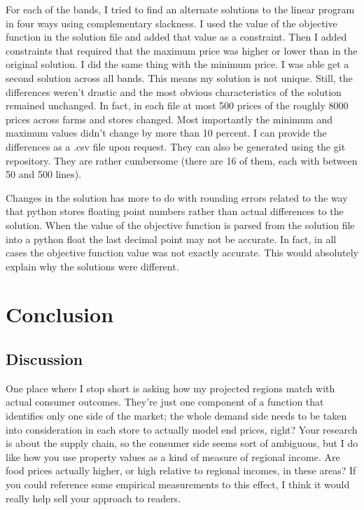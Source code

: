 \documentclass{report}
\begin{document}
For each of the bands, I tried to find an alternate solutions to the linear program in four ways using complementary slackness. I used the value of the objective function in the solution file and added that value as a constraint. Then I added constraints that required that the maximum price was higher or lower than in the original solution. I did the same thing with the minimum price. I was able get a second solution across all bands. This means my solution is not unique. Still, the differences weren't drastic and the most obvious characteristics of the solution remained unchanged. In fact, in each file at most 500 prices of the roughly 8000 prices across farms and stores changed. Most importantly the minimum and maximum values didn't change by more than 10 percent. I can provide the differences as a .csv file upon request. They can also be generated using the git repository. They are rather cumbersome (there are 16 of them, each with between 50 and 500 lines).

Changes in the solution has more to do with rounding errors related to the way that python stores floating point numbers rather than actual differences to the solution. When the value of the objective function is parsed from the solution file into a python float the last decimal point may not be accurate. In fact, in all cases the objective function value was not exactly accurate. This would absolutely explain why the solutions were different.


\chapter{Conclusion}

\section{Discussion}

One place where I stop short is asking how my projected regions match with actual consumer outcomes.
They’re just one component of a function that
identifies only one side of the market; the whole demand side needs to be taken into
consideration in each store to actually model end prices, right? Your research is about the
supply chain, so the consumer side seems sort of ambiguous, but I do like how you use
property values as a kind of measure of regional income.
Are food prices actually higher, or high relative to regional incomes, in
these areas? If you could reference some empirical measurements to this effect, I think it would
really help sell your approach to readers.
\end{document}
